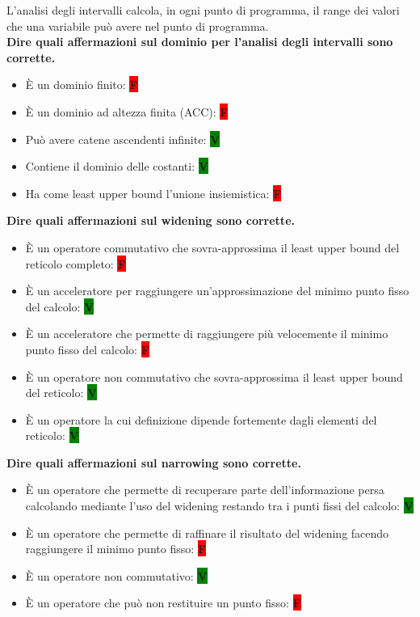 \documentclass[a4paper,oneside,titlepage]{book}
\begin{document}
L'analisi degli intervalli calcola, in ogni punto di programma, il range dei valori che una variabile può avere nel punto di programma.
\bigskip
\\
\textbf{Dire quali affermazioni sul dominio per l'analisi degli intervalli sono corrette.}
\begin{itemize}
    \item \`{E} un dominio finito: \colorbox{red}{\textbf{F}}
    \item \`{E} un dominio ad altezza finita (ACC): \colorbox{red}{\textbf{F}}
    \item Può avere catene ascendenti infinite: \colorbox{green}{\textbf{V}}
    \item Contiene il dominio delle costanti: \colorbox{green}{\textbf{V}}
    \item Ha come least upper bound l'unione insiemistica: \colorbox{red}{\textbf{F}}
\end{itemize}
\noindent
\textbf{Dire quali affermazioni sul widening sono corrette.}
\begin{itemize}
    \item \`{E} un operatore commutativo che sovra-approssima il least upper bound del reticolo completo: \colorbox{red}{\textbf{F}}
    \item \`{E} un acceleratore per raggiungere un'approssimazione del minimo punto fisso del calcolo: \colorbox{green}{\textbf{V}}
    \item \`{E} un acceleratore che permette di raggiungere più velocemente il minimo punto fisso del calcolo: \colorbox{red}{\textbf{F}}
    \item \`{E} un operatore non commutativo che sovra-approssima il least upper bound del reticolo: \colorbox{green}{\textbf{V}}
    \item \`{E} un operatore la cui definizione dipende fortemente dagli elementi del reticolo: \colorbox{green}{\textbf{V}}
\end{itemize}
\noindent
\textbf{Dire quali affermazioni sul narrowing sono corrette.}
\begin{itemize}
    \item \`{E} un operatore che permette di recuperare parte dell'informazione persa calcolando mediante l'uso del widening restando tra i punti fissi del calcolo: \colorbox{green}{\textbf{V}}
    \item \`{E} un operatore che permette di raffinare il risultato del widening facendo raggiungere il minimo punto fisso: \colorbox{red}{\textbf{F}}
    \item \`{E} un operatore non commutativo: \colorbox{green}{\textbf{V}}
    \item \`{E} un operatore che può non restituire un punto fisso: \colorbox{red}{\textbf{F}}
\end{itemize}
\end{document}
